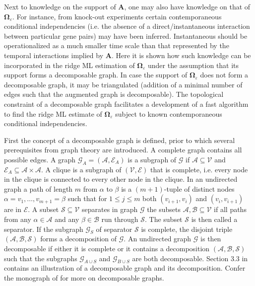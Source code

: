 Next to knowledge on the support of $\mathbf{A}$, one may also have knowledge on that of $\mathbf{\Omega}_{\varepsilon}$. For instance, from knock-out experiments certain contemporaneous conditional independencies (i.e. the absence of a direct/instantaneous interaction between particular gene pairs) may have been inferred. Instantaneous should be operationalized as a much smaller time scale than that represented by the temporal interactions implied by $\mathbf{A}$. Here it is shown how such knowledge can be incorporated in the ridge ML estimation of $\mathbf{\Omega}_{\varepsilon}$ under the assumption that its support forms a decomposable graph. In case the support of $\mathbf{\Omega}_{\varepsilon}$ does not form a decomposable graph, it may be triangulated (addition of a minimal number of edges such that the augmented graph is decomposable). The topological constraint of a decomposable graph facilitates a development of a fast algorithm to find the ridge ML estimate of $\mathbf{\Omega}_{\varepsilon}$ subject to known contemporaneous conditional independencies.

First the concept of a decomposable graph is defined, prior to which several prerequisites from graph theory are introduced. A complete graph contains all possible edges. A graph $\mathcal{G}_A = (\mathcal{A}, \mathcal{E}_A)$ is a subgraph of $\mathcal{G}$ if $\mathcal{A} \subseteq \mathcal{V}$ and $\mathcal{E}_A \subseteq \mathcal{A} \times \mathcal{A}$. A clique is a subgraph of $(\mathcal{V}, \mathcal{E})$ that is complete, i.e. every node in the clique is connected to every other node in the clique. In an undirected graph a path of length $m$ from $\alpha$ to $\beta$ is a $(m+1)$-tuple of distinct nodes $\alpha = v_1, \ldots,v_{m+1} = \beta$ such that for $1 \leq j \leq m$ both $(v_{i+1}, v_{i})$ and $(v_i, v_{i+1})$ are in $\mathcal{E}$. A subset $\mathcal{S} \subseteq \mathcal{V}$ separates in graph $\mathcal{G}$ the subsets $\mathcal{A}, \mathcal{B} \subseteq \mathcal{V}$ if all paths from any $\alpha \in \mathcal{A}$ and any $\beta \in \mathcal{B}$ run through $\mathcal{S}$. The subset $\mathcal{S}$ is then called a separator. If the subgraph $\mathcal{G}_S$  of separator $\mathcal{S}$ is complete, the disjoint triple $(\mathcal{A}, \mathcal{B}, \mathcal{S})$ forms a decomposition of $\mathcal{G}$. An undirected graph $\mathcal{G}$ is then decomposable if either it is complete or it contains a decomposition $(\mathcal{A}, \mathcal{B}, \mathcal{S})$ such that the subgraphs $\mathcal{G}_{A \cup S}$ and $\mathcal{G}_{B \cup S}$ are both decomposable. Section 3.3 in \cite{Supp2018} contains an illustration of a decomposable graph and its decomposition. Confer the monograph of \cite{Lauritzen1996} for more on decomposable graphs.

